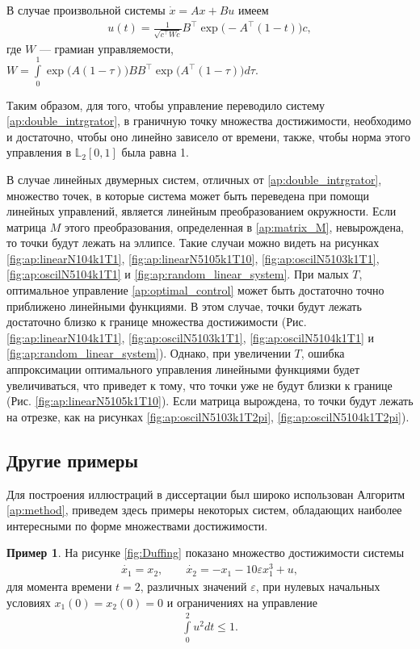 \documentclass[../main.tex]{subfiles}
\begin{document}
 В случае произвольной системы $\dot{x} =Ax + Bu$ имеем
 \begin{gather}\label{ap:optimal_control}
 	u(t) = \frac{1}{\sqrt{c^{\top}Wc}} B^{\top} \operatorname{exp}\big(-A^{\top}(1-t)\big) c,
 \end{gather}
 где $W$ --- грамиан управляемости, $W = \int\limits_{0}^{1} \operatorname{exp}\big(A(1-\tau)\big) B B^{\top} \operatorname{exp}\big(A^{\top}(1-\tau)\big) d\tau$.
 
 Таким образом, для того, чтобы управление переводило систему \eqref{ap:double_intrgrator}, в граничную точку множества достижимости, необходимо и достаточно, чтобы оно линейно зависело от времени, также, чтобы норма этого управления в $\mathbb{L}_2[0,1]$ была равна 1. 
 
 В случае линейных двумерных систем, отличных от \eqref{ap:double_intrgrator}, множество точек, в которые система может быть переведена при помощи линейных управлений, является линейным преобразованием окружности.
 Если матрица $M$ этого преобразования, определенная в \eqref{ap:matrix_M}, невырождена, то точки будут лежать на эллипсе. 
 Такие случаи можно видеть на рисунках \ref{fig:ap:linearN104k1T1}, \ref{fig:ap:linearN5105k1T10}, \ref{fig:ap:oscilN5103k1T1}, \ref{fig:ap:oscilN5104k1T1} и \ref{fig:ap:random_linear_system}.
 При малых $T$, оптимальное управление \eqref{ap:optimal_control} может быть достаточно точно приближено линейными функциями. 
 В этом случае, точки будут лежать достаточно близко к границе множества достижимости (Рис. \ref{fig:ap:linearN104k1T1}, \ref{fig:ap:oscilN5103k1T1}, \ref{fig:ap:oscilN5104k1T1} и \ref{fig:ap:random_linear_system}).
 Однако, при увеличении $T$, ошибка аппроксимации оптимального управления линейными функциями будет увеличиваться, что приведет к тому, что точки уже не будут близки к границе (Рис. \ref{fig:ap:linearN5105k1T10}). 
 Если матрица вырождена, то точки будут лежать на отрезке, как на рисунках \ref{fig:ap:oscilN5103k1T2pi}, \ref{fig:ap:oscilN5104k1T2pi}).
 
 \subsection{Другие примеры}
 
 Для построения иллюстраций в диссертации был широко использован Алгоритм \ref{ap:method}, приведем здесь примеры некоторых систем, обладающих наиболее интересными по форме множествами достижимости.
  
  \textbf{Пример 1}. На рисунке \ref{fig:Duffing} показано множество достижимости системы 
  \begin{gather}\label{ap:Duffing}
  	\dot{x_1} = x_2, \qquad
  	\dot{x_2} = -x_1 - 10 \varepsilon x_1^3 + u ,
  \end{gather}
  для момента времени $t = 2$, различных значений $\varepsilon$, при нулевых начальных условиях $x_1(0) = x_2(0) = 0 $ и ограничениях на управление 
  \begin{gather}\label{ap:Duffing_controls}
  	\int\limits_0^2u^2dt \leqslant 1.
  \end{gather}
  	  
\end{document}
